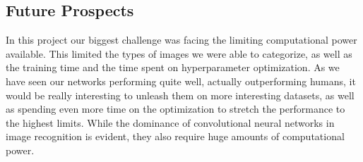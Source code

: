 \documentclass[10pt, twocolumn]{article}
\begin{document}
\subsection{Future Prospects}
In this project our biggest challenge was facing the limiting computational power available. This limited the types of images we were able to categorize, as well as the training time and the time spent on hyperparameter optimization. As we have seen our networks performing quite well, actually outperforming humans, it would be really interesting to unleash them on more interesting datasets, as well as spending even more time on the optimization to stretch the performance to the highest limits. While the dominance of convolutional neural networks in image recognition is evident, they also require huge amounts of computational power.
\end{document}
